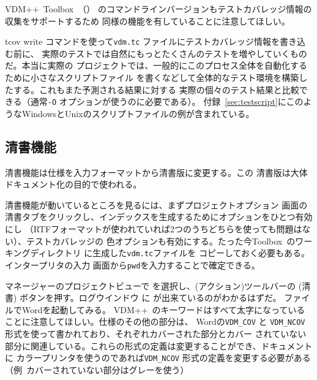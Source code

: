 \documentclass[\pformat,12pt]{jarticle}
\newcommand{\vdmslpp}{VDM++}
\newcommand{\Toolbox}{Toolbox}
\newcommand{\guicmd}[1]{{\gt #1}}
\begin{document}
\vdmslpp\ \Toolbox\ （）
のコマンドラインバージョンもテストカバレッジ情報の収集をサポートするため
同様の機能を有していることに注意してほしい。

\guicmd{tcov write} コマンドを使って\texttt{vdm.tc} ファイルにテストカバレッジ情報を書き込む前に、
実際のテストでは自然にもっとたくさんのテストを増やしていくものだ。本当に実際の
プロジェクトでは、一般的にこのプロセス全体を自動化するために小さなスクリプトファイル
を書くなどして全体的なテスト環境を構築したする。これもまた予測される結果に対する
実際の個々のテスト結果と比較できる（通常{\tt -O} オプションが使うのに必要である）。
付録~\ref{sec:testscript}にこのようなWindowsとUnixのスクリプトファイルの例が含まれている。

\subsection{清書機能}\label{subsec:pp}



清書機能は仕様を入力フォーマットから清書版に変更する。この
清書版は大体ドキュメント化の目的で使われる。
  
清書機能が動いているところを見るには、まず\guicmd{プロジェクトオプション} 画面の
\guicmd{清書}タブをクリックし、インデックスを生成するためにオプションをひとつ有効にし
（RTFフォーマットが使われていれば2つのうちどちらを使っても問題はない）、テストカバレッジの
色オプションも有効にする。たった今\Toolbox\ のワーキングディレクトリ に生成した{\tt vdm.tc}ファイルを
コピーしておく必要もある。インタープリタの\guicmd{入力} 画面から{\tt pwd}を入力することで確定できる。

\guicmd{マネージャー}の\guicmd{プロジェクトビュー}で
を選択し、(\guicmd{アクション})ツールバーの 
(\guicmd{清書}) ボタンを押す。\guicmd{ログウインドウ} に
が出来ているのがわかるはずだ。
ファイルでWordを起動してみる。
\vdmslpp\ のキーワードはすべて太字になっていることに注意してほしい。仕様のその他の部分は、
Wordの{\tt VDM\_COV}  と  {\tt VDM\_NCOV} 形式を使って書かれており、それぞれカバーされた部分とカバー
されていない部分に関連している。これらの形式の定義は変更することができ、ドキュメントに
カラープリンタを使うのであれば{\tt VDM\_NCOV} 形式の定義を変更する必要がある
（例\ カバーされていない部分はグレーを使う）
\end{document}
